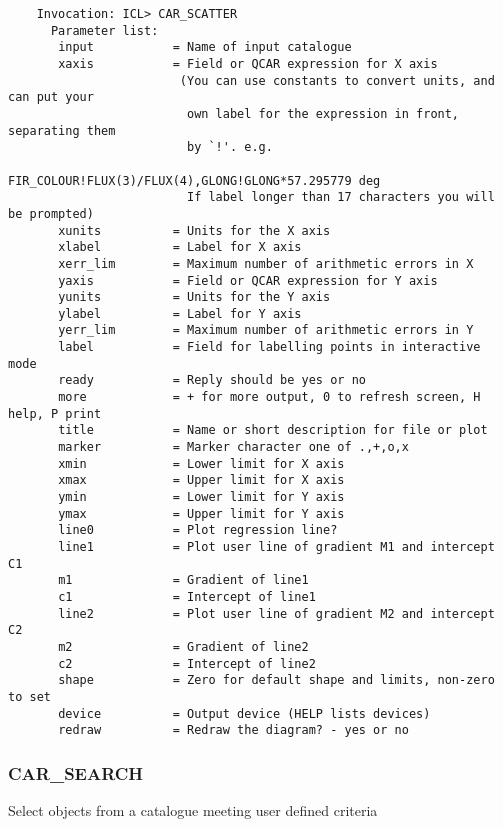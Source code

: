 \begin{verbatim}
    Invocation: ICL> CAR_SCATTER
      Parameter list:
       input           = Name of input catalogue
       xaxis           = Field or QCAR expression for X axis
                        (You can use constants to convert units, and can put your
                         own label for the expression in front, separating them
                         by `!'. e.g.
                         FIR_COLOUR!FLUX(3)/FLUX(4),GLONG!GLONG*57.295779 deg
                         If label longer than 17 characters you will be prompted)
       xunits          = Units for the X axis
       xlabel          = Label for X axis
       xerr_lim        = Maximum number of arithmetic errors in X
       yaxis           = Field or QCAR expression for Y axis
       yunits          = Units for the Y axis
       ylabel          = Label for Y axis
       yerr_lim        = Maximum number of arithmetic errors in Y
       label           = Field for labelling points in interactive mode
       ready           = Reply should be yes or no
       more            = + for more output, 0 to refresh screen, H help, P print
       title           = Name or short description for file or plot
       marker          = Marker character one of .,+,o,x
       xmin            = Lower limit for X axis
       xmax            = Upper limit for X axis
       ymin            = Lower limit for Y axis
       ymax            = Upper limit for Y axis
       line0           = Plot regression line?
       line1           = Plot user line of gradient M1 and intercept C1
       m1              = Gradient of line1
       c1              = Intercept of line1
       line2           = Plot user line of gradient M2 and intercept C2
       m2              = Gradient of line2
       c2              = Intercept of line2
       shape           = Zero for default shape and limits, non-zero to set
       device          = Output device (HELP lists devices)
       redraw          = Redraw the diagram? - yes or no
\end{verbatim}

\subsubsection{CAR\_SEARCH}

Select objects from a catalogue meeting user defined criteria


